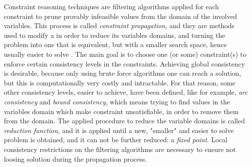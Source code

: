 Constraint reasoning techniques are filtering algorithms applied for each constraint to prune provably infeasible values from the domain of the involved variables. This process is called \textit{constraint propagation}, and they are methods used to modify a \CSP{} in order to reduce its variables domains, and turning the problem into one that is equivalent, but with a smaller search space, hence usually easier to solve \cite{ChristianBessiere2006}. The main goal is to choose one (or some) constraint(s) to enforce certain consistency levels in the constraints. Achieving global consistency is desirable, because only using brute force algorithms one can reach a solution, but this is computationally very costly and intractable. %
For that reason, some other consistency levels, easier to achieve, have been defined, like for example, \textit{arc consistency} and \textit{bound consistency}, which means trying to find values in the variables domain which make constraint unsatisfiable, in order to remove them from the domain. The applied procedure to reduce the variable domains is called \textit{reduction function}, and it is applied until a new, "smaller" and easier to solve problem is obtained, and it can not be further reduced: a \textit{fixed point}. Local consistency restrictions on the filtering algorithms are necessary to ensure not loosing solution during the propagation process.




